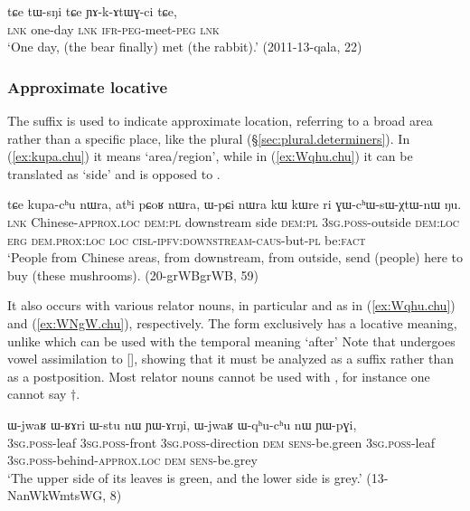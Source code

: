  \begin{exe}
\ex \label{ex:tWsNi.tCe}
\gll   tɕe tɯ-sŋi tɕe ɲɤ-k-ɤtɯɣ-ci tɕe, \\
\textsc{lnk} one-day \textsc{lnk} \textsc{ifr}-\textsc{peg}-meet-\textsc{peg} \textsc{lnk} \\
\glt  `One day, (the bear finally) met (the rabbit).' (2011-13-qala, 22)
\end{exe}


\subsubsection{Approximate locative} \label{sec:approximate.locative}
The suffix  is used to indicate approximate location, referring to a broad area rather than a specific place, like the plural  (§\ref{sec:plural.determiners}). In (\ref{ex:kupa.chu}) it means `area/region', while in (\ref{ex:Wqhu.chu}) it can be translated as `side' and is opposed to .
 
 \begin{exe}
\ex \label{ex:kupa.chu}
 \gll  tɕe kupa-cʰu nɯra, atʰi pɕoʁ nɯra, ɯ-pɕi nɯra kɯ kɯre ri ɣɯ-cʰɯ-sɯ-χtɯ-nɯ ŋu.  \\
 \textsc{lnk} Chinese-\textsc{approx}.\textsc{loc} \textsc{dem}:\textsc{pl}  downstream side \textsc{dem}:\textsc{pl} \textsc{3sg}.\textsc{poss}-outside \textsc{dem}:\textsc{loc} \textsc{erg} \textsc{dem}.\textsc{prox}:\textsc{loc} \textsc{loc} \textsc{cisl}-\textsc{ipfv}:\textsc{downstream}-\textsc{caus}-but-\textsc{pl} be:\textsc{fact} \\
 \glt `People from Chinese areas, from downstream, from outside, send (people) here to buy (these mushrooms). (20-grWBgrWB, 59)
 \end{exe}
 
 It also occurs with various relator nouns, in particular  and  as in (\ref{ex:Wqhu.chu}) and (\ref{ex:WNgW.chu}), respectively. The form  exclusively has a locative meaning, unlike  which can be used with the temporal meaning `after' Note that  undergoes vowel assimilation to [], showing that it must be analyzed as a suffix rather than as a postposition. Most relator nouns cannot be used with , for instance one cannot say $\dagger$.

  \begin{exe}
\ex \label{ex:Wqhu.chu}
 \gll  ɯ-jwaʁ ɯ-ʁɤri ɯ-stu nɯ ɲɯ-ɤrŋi, ɯ-jwaʁ ɯ-qʰu-cʰu nɯ ɲɯ-pɣi, \\
 \textsc{3sg}.\textsc{poss}-leaf  \textsc{3sg}.\textsc{poss}-front \textsc{3sg}.\textsc{poss}-direction \textsc{dem} \textsc{sens}-be.green   \textsc{3sg}.\textsc{poss}-leaf  \textsc{3sg}.\textsc{poss}-behind-\textsc{approx}.\textsc{loc} \textsc{dem} \textsc{sens}-be.grey \\
 \glt  `The upper side of its leaves is green, and the lower side is grey.' (13-NanWkWmtsWG, 8)
  \end{exe}
  
